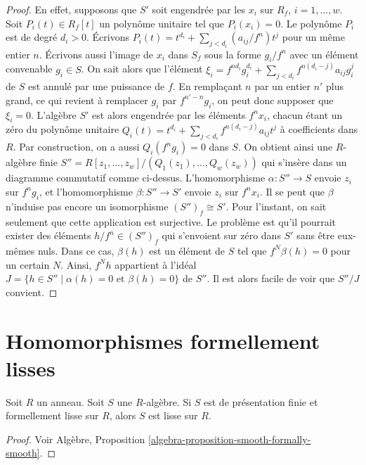 \begin{proof}
En effet, supposons que $S'$ soit engendr\'ee par
les $x_i$ sur $R_f$, $i = 1, \ldots, w$. Soit $P_i(t) \in R_f[t]$
un polyn\^ome unitaire tel que $P_i(x_i) = 0$.
Le polyn\^ome $P_i$ est de degr\'e $d_i > 0$. \'Ecrivons
$P_i(t) = t^{d_i} + \sum_{j < d_i} (a_{ij}/f^n) t^j$
pour un m\^eme entier $n$. \'Ecrivons aussi
l'image de $x_i$ dans $S_f$ sous la forme $g_i / f^n$
avec un \'el\'ement convenable $g_i \in S$. On sait alors
que l'\'el\'ement
$\xi_i = f^{nd_i} g_i^{d_i} + \sum_{j < d_i} f^{n(d_i - j)} a_{ij} g_i^j$
de $S$ est annul\'e par une puissance de $f$.
En rempla\c cant $n$ par un entier $n'$ plus grand, ce qui revient \`a remplacer
$g_i$ par $f^{n' - n}g_i$, on peut donc supposer que $\xi_i = 0$.
L'alg\`ebre $S'$ est alors engendr\'ee par les \'el\'ements
$f^n x_i$, chacun \'etant un z\'ero du
polyn\^ome unitaire $Q_i(t) = t^{d_i} +
\sum_{j < d_i} f^{n(d_i - j)} a_{ij} t^j$
\`a coefficients dans $R$. Par construction, on a aussi
$Q_i(f^ng_i) = 0$ dans $S$. On obtient ainsi une $R$-alg\`ebre finie
$S'' = R[z_1, \ldots, z_w]/(Q_1(z_1), \ldots, Q_w(z_w))$
qui s'ins\`ere dans un diagramme commutatif comme ci-dessus.
L'homomorphisme $\alpha : S'' \to S$ envoie $z_i$ sur $f^ng_i$, et
l'homomorphisme $\beta : S'' \to S'$ envoie $z_i$ sur $f^nx_i$.
Il se peut que $\beta$ n'induise pas encore un
isomorphisme $(S'')_f \cong S'$.
Pour l'instant, on sait seulement que cette application
est surjective. Le probl\`eme est qu'il pourrait exister des
\'el\'ements $h/f^n \in (S'')_f$ qui s'envoient sur z\'ero
dans $S'$ sans \^etre eux-m\^emes nuls. Dans ce cas, $\beta(h)$
est un \'el\'ement de $S$ tel que $f^N \beta(h) = 0$
pour un certain $N$. Ainsi, $f^N h$ appartient \`a l'id\'eal
$J = \{h \in S'' \mid \alpha(h) = 0 \text{ et }
\beta(h) = 0\}$ de $S''$. Il est alors facile de voir que
$S''/J$ convient.
\end{proof}
\section{Homomorphismes formellement lisses}
\label{section-formally-smooth}

\begin{lemma}
\label{lemma-formally-smooth-smooth}
Soit $R$ un anneau. Soit $S$ une $R$-alg\`ebre.
Si $S$ est de pr\'esentation finie et formellement lisse sur $R$,
alors $S$ est lisse sur $R$.
\end{lemma}

\begin{proof}
Voir Alg\`ebre, Proposition \ref{algebra-proposition-smooth-formally-smooth}.
\end{proof}

